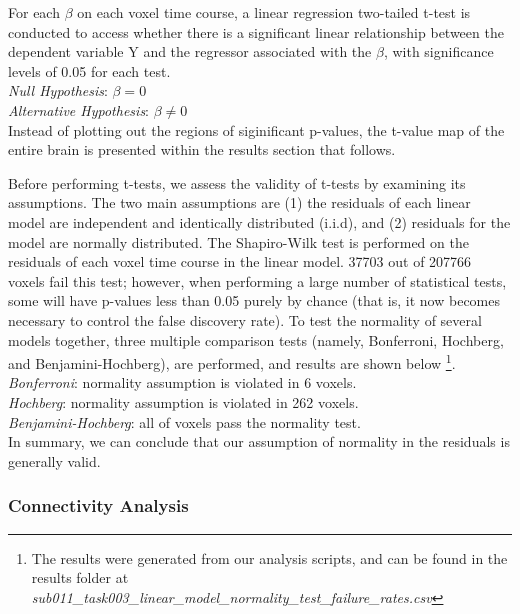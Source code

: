 \documentclass[11pt]{article}
\begin{document}
For each $\beta$ on each voxel time course, a linear regression two-tailed
t-test is conducted to access whether there is a significant linear relationship
between the dependent variable Y and the regressor associated with the $\beta$,
with significance levels of 0.05 for each test. \\
 
\textit{Null Hypothesis}: $ \beta = 0$ \\

\textit{Alternative Hypothesis}: $\beta \neq 0$ \\

Instead of plotting out the regions of siginificant p-values, the t-value map of
the entire brain is presented within the results section that follows. 

Before performing t-tests, we assess the validity of t-tests by examining its
assumptions. The two main assumptions are (1) the residuals of each linear model
are independent and identically distributed (i.i.d), and (2) residuals for the model
are normally distributed. The Shapiro-Wilk test is performed on the residuals of
each voxel time course in the linear model. 37703 out of 207766 voxels fail this
test; however, when performing a large number of statistical tests, some will have
p-values less than 0.05 purely by chance (that is, it now becomes necessary to control the false discovery rate). To test the normality of several models together, three multiple comparison tests (namely, Bonferroni, Hochberg, and Benjamini-Hochberg), are performed, and results are shown below \footnote{The results were generated from our analysis scripts, and can be found in the results folder at \textit{sub011\_task003\_linear\_model\_normality\_test\_failure\_rates.csv}}. \\

\textit{Bonferroni}: normality assumption is violated in 6 voxels. \\

\textit{Hochberg}: normality assumption is violated in 262 voxels. \\

\textit{Benjamini-Hochberg}: all of voxels pass the normality test. \\

In summary, we can conclude that our assumption of normality in the residuals is
generally valid.

\subsubsection{Connectivity Analysis}
\end{document}
